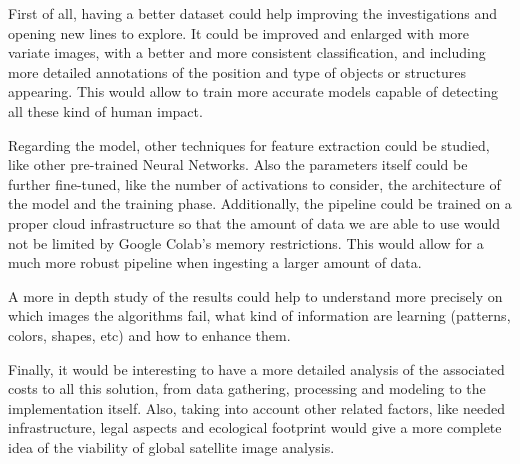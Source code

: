 First of all, having a better dataset could help improving the investigations and opening new lines to explore. It could be improved and enlarged with more variate images, with a better and more consistent classification, and including more detailed annotations of the position and type of objects or structures appearing. This would allow to train more accurate models capable of detecting all these kind of human impact.

Regarding the model, other techniques for feature extraction could be studied, like other pre-trained Neural Networks. Also the parameters itself could be further fine-tuned, like the number of activations to consider, the architecture of the model and the training phase. Additionally, the pipeline could be trained on a proper cloud infrastructure so that the amount of data we are able to use would not be limited by Google Colab's memory restrictions. This would allow for a much more robust pipeline when ingesting a larger amount of data.

A more in depth study of the results could help to understand more precisely on which images the algorithms fail, what kind of information are learning (patterns, colors, shapes, etc) and how to enhance them.

Finally, it would be interesting to have a more detailed analysis of the associated costs to all this solution, from data gathering, processing and modeling to the implementation itself. Also, taking into account other related factors, like needed infrastructure, legal aspects and ecological footprint \parencite{Strubell2019} would give a more complete idea of the viability of global satellite image analysis.
